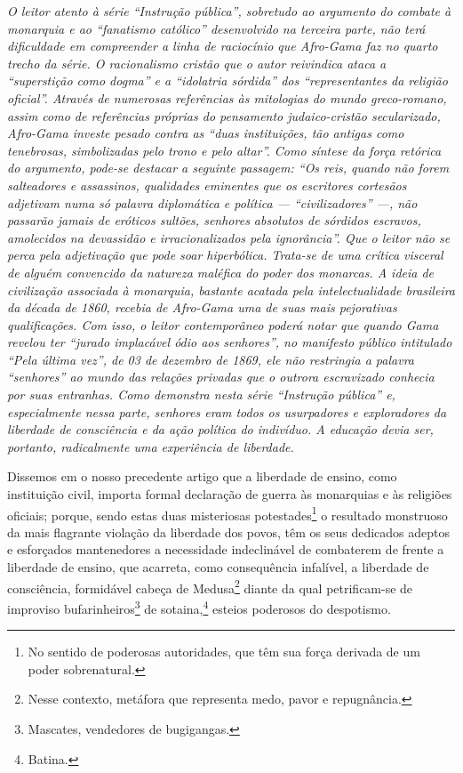 \begin{didascalia}\itshape
O leitor atento à série ``Instrução pública'', sobretudo ao
argumento do combate à monarquia e ao ``fanatismo católico'' desenvolvido
na terceira parte, não terá dificuldade em compreender a linha de
raciocínio que Afro-Gama faz no quarto trecho da série. O
racionalismo cristão que o autor reivindica ataca a ``superstição como
dogma'' e a ``idolatria sórdida'' dos ``representantes da religião oficial''.
Através de numerosas referências às mitologias do mundo greco-romano,
assim como de referências próprias do pensamento judaico-cristão
secularizado, Afro-Gama investe pesado contra as ``duas
instituições, tão antigas como tenebrosas, simbolizadas pelo trono e
pelo altar''. Como síntese da força retórica do argumento, pode-se
destacar a seguinte passagem: ``Os reis, quando não forem salteadores e
assassinos, qualidades eminentes que os escritores cortesãos adjetivam
numa só palavra diplomática e política --- ``civilizadores'' ---, não
passarão jamais de eróticos sultões, senhores absolutos de sórdidos
escravos, amolecidos na devassidão e irracionalizados pela ignorância''.
Que o leitor não se perca pela adjetivação que pode soar hiperbólica.
Trata-se de uma crítica visceral de alguém convencido da natureza
maléfica do poder dos monarcas. A ideia de civilização associada à
monarquia, bastante acatada pela intelectualidade brasileira da década
de 1860, recebia de Afro-Gama uma de suas mais pejorativas
qualificações. Com isso, o leitor contemporâneo poderá notar que quando
Gama revelou ter ``jurado implacável ódio aos senhores'', no manifesto
público intitulado ``Pela última vez'', de 03 de dezembro de 1869, ele não
restringia a palavra ``senhores'' ao mundo das relações privadas que o
outrora escravizado conhecia por suas entranhas. Como demonstra nesta
série ``Instrução pública'' e, especialmente nessa parte,
senhores eram todos os usurpadores e exploradores da liberdade de
consciência e da ação política do indivíduo. A educação devia ser,
portanto, radicalmente uma experiência de liberdade.
\end{didascalia}



Dissemos em o nosso precedente artigo que a liberdade de ensino, como
instituição civil, importa formal declaração de guerra às monarquias e
às religiões oficiais; porque, sendo estas duas misteriosas
potestades\footnote{No sentido de poderosas autoridades, que têm sua
  força derivada de um poder sobrenatural.} o resultado monstruoso da
mais flagrante violação da liberdade dos povos, têm os seus dedicados
adeptos e esforçados mantenedores a necessidade indeclinável de
combaterem de frente a liberdade de ensino, que acarreta, como
consequência infalível, a liberdade de consciência, formidável cabeça de
Medusa\footnote{Nesse contexto, metáfora que representa medo, pavor e
  repugnância.} diante da qual petrificam-se de improviso
bufarinheiros\footnote{Mascates, vendedores de bugigangas.} de
sotaina,\footnote{Batina.} esteios poderosos do despotismo.

